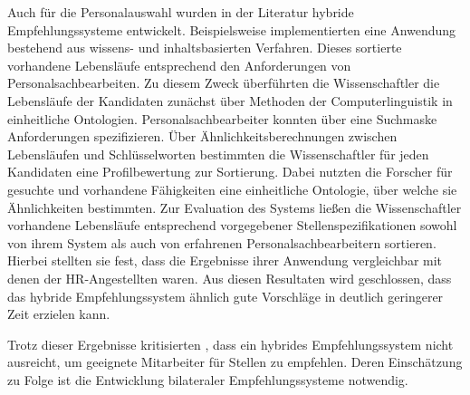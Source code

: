Auch für die Personalauswahl wurden in der Literatur hybride Empfehlungssysteme entwickelt. Beispielsweise implementierten \textcite[S. 1ff.]{mohamed:2018} eine Anwendung bestehend aus wissens- und inhaltsbasierten Verfahren. Dieses sortierte vorhandene Lebensläufe entsprechend den Anforderungen von Personalsachbearbeiten. Zu diesem Zweck überführten die Wissenschaftler die Lebensläufe der Kandidaten zunächst über Methoden der Computerlinguistik in einheitliche Ontologien. Personalsachbearbeiter konnten über eine Suchmaske Anforderungen spezifizieren. Über Ähnlichkeitsberechnungen zwischen Lebensläufen und Schlüsselworten bestimmten die Wissenschaftler für jeden Kandidaten eine Profilbewertung zur Sortierung. Dabei nutzten die Forscher für gesuchte und vorhandene Fähigkeiten eine einheitliche Ontologie, über welche sie Ähnlichkeiten bestimmten. Zur Evaluation des Systems ließen die Wissenschaftler vorhandene Lebensläufe entsprechend vorgegebener Stellenspezifikationen sowohl von ihrem System als auch von erfahrenen Personalsachbearbeitern sortieren. Hierbei stellten sie fest, dass die Ergebnisse ihrer Anwendung vergleichbar mit denen der HR-Angestellten waren. Aus diesen Resultaten wird geschlossen, dass das hybride Empfehlungssystem ähnlich gute Vorschläge in deutlich geringerer Zeit erzielen kann.

Trotz dieser Ergebnisse kritisierten \textcite[S. 1]{malinowski:2008}, dass ein hybrides Empfehlungssystem nicht ausreicht, um geeignete Mitarbeiter für Stellen zu empfehlen. Deren Einschätzung zu Folge ist die Entwicklung bilateraler Empfehlungssysteme notwendig.
